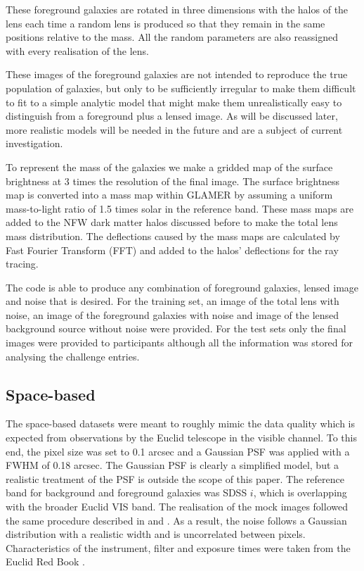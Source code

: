 \documentclass{aa}
\begin{document}
These foreground galaxies are rotated in three dimensions with the halos of the lens each time a random lens is produced so that they remain in the same positions relative to the mass.  All the random parameters are also reassigned with every realisation of the lens.

These images of the foreground galaxies are not intended to reproduce the true population of galaxies, but only to be sufficiently irregular to make them difficult to fit to a simple analytic model that might make them unrealistically easy to distinguish from a foreground plus a lensed image.   As will be discussed later, more realistic models will be needed in the future and are a subject of current investigation.

To represent the mass of the galaxies we make a gridded map of the surface brightness at 3 times the resolution of the final image.  The surface brightness map is converted into a mass map within GLAMER by assuming a uniform mass-to-light ratio of 1.5 times solar in the reference band.  These mass maps are added to the NFW dark matter halos discussed before to make the total lens mass distribution.  The deflections caused by the mass maps are calculated by Fast Fourier Transform (FFT) and added to the halos'  deflections for the ray tracing. 

The code is able to produce any combination of foreground galaxies, lensed image and noise that is desired.  For the training set,  an image of the total lens with noise, an image of the foreground galaxies with noise and image of the lensed background source without noise were provided.
For the test sets only the final images were provided to participants although all the information was stored for analysing the challenge entries.

\subsection{Space-based}
\label{sec:sim-space-based}

The space-based datasets were meant to roughly mimic the data quality which is expected from observations by the Euclid telescope in the visible channel. To this end, the pixel size was set to 0.1 arcsec and a Gaussian PSF was applied with a FWHM of 0.18 arcsec. The Gaussian PSF is clearly a simplified model, but a realistic treatment of the PSF is outside the scope of this paper. The reference band for background and foreground galaxies was SDSS $i$, which is overlapping with the broader Euclid VIS band. The realisation of the mock images followed the same procedure described in \citet{2004PASP..116..750G} and \citet{2008AandA...482..403M}. As a result, the noise follows a Gaussian distribution with a realistic width and is uncorrelated between pixels. Characteristics of the instrument, filter and exposure times were taken from the Euclid Red Book \citep{2011arXiv1110.3193L}.
 
\end{document}
